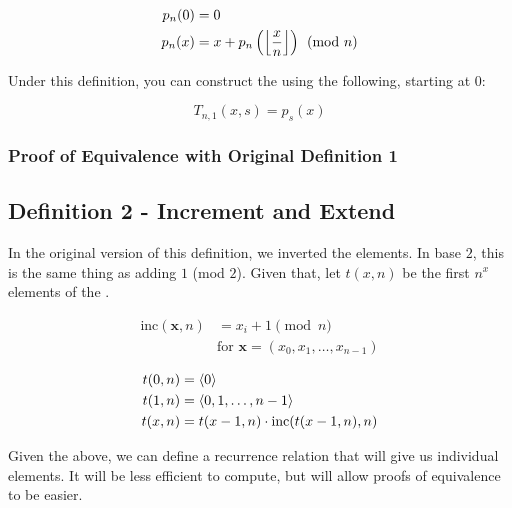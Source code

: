 \documentclass[conference]{IEEEtran}
\begin{document}
\begin{equation}
    \begin{aligned}
        p_n(0) &= 0 \\
        p_n(x) &= x + p_n\left(\left\lfloor \dfrac{x}{n} \right\rfloor\right) \pmod{n}
    \end{aligned}
\end{equation}

Under this definition, you can construct the \TMS using the following, starting at 0:

\begin{equation}
    T_{n,1}(x, s) = p_s(x)
\end{equation}

\subsubsection{Proof of Equivalence with Original Definition 1}

\subsection{Definition 2 - Increment and Extend}

In the original version of this definition, we inverted the elements. In base $2$, this is the same thing as adding $1$ (mod $2$). Given that, let $t(x, n)$ be the first $n^x$ elements of the \ETMS.

\begin{equation}
    \begin{aligned}
        \text{inc}(\mathbf{x}, n) &= x_i + 1 \pmod{n} \\
        &\text{for } \mathbf{x} = (x_0, x_1, \ldots, x_{n-1})
    \end{aligned}
\end{equation}

\begin{equation}
    \begin{aligned}
        t(0, n) &= \langle 0 \rangle \\
        t(1, n) &= \langle 0, 1, \ldots, n - 1 \rangle \\
        t(x, n) &= t(x - 1, n) \cdot \text{inc}(t(x - 1, n), n)
    \end{aligned}
\end{equation}

Given the above, we can define a recurrence relation that will give us individual elements. It will be less efficient to compute, but will allow proofs of equivalence to be easier.
\end{document}

